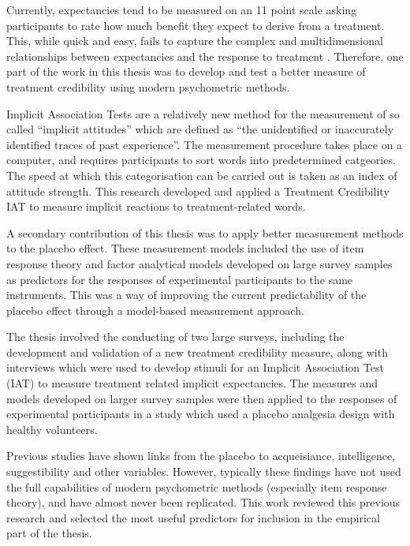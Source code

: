 \documentclass{article}
\begin{document}
Currently, expectancies tend to be measured on an 11 point scale asking participants to rate how much benefit they expect to derive from a treatment. This, while quick and easy, fails to capture the complex and multidimensional relationships between expectancies and the response to treatment \citep{Stone2005,Kaptchuk2008a}. Therefore, one part of the work in this thesis was to develop and test a better measure of treatment credibility using modern psychometric methods.    

Implicit Association Tests \citep{Greenwald1998} are a relatively new method for the measurement of so called ``implicit attitudes'' which are defined as ``the unidentified or inaccurately identified traces of past experience''. The measurement procedure takes place on a computer, and requires participants to sort words into predetermined catgeories. The speed at which this categorisation can be carried out is taken as an index of attitude strength. This research developed and applied a Treatment Credibility IAT to measure implicit reactions to treatment-related words. 

A secondary contribution of this thesis was to apply better measurement methods to the placebo effect. These measurement models included the use of item response theory and factor analytical models developed on large survey samples as predictors for the responses of experimental participants to the same instruments. This was a way of improving the current predictability of the placebo effect through a model-based measurement approach. 

The thesis involved the conducting of two large surveys, including the development and validation of a new treatment credibility measure, along with interviews which were used to develop stimuli for an Implicit Association Test (IAT) to measure treatment related implicit expectancies. The measures and models developed on larger survey samples were then applied to the responses of experimental participants in a study which used a placebo analgesia design with healthy volunteers. 


Previous studies have shown links from the placebo to acqueisiance, intelligence, suggestibility and other variables. However, typically these findings have not used the full capabilities of modern psychometric methods (especially item response theory), and have almost never been replicated. This work reviewed this previous research and selected the most useful predictors for inclusion in the empirical part of the thesis. 
\end{document}
